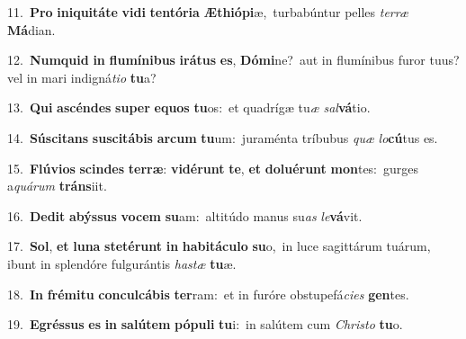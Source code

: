 {{\numbfont\textcolor{\numbcolor}{11.}}~\textbf{Pro} \textbf{in}\-\textbf{i}\textbf{qui}\textbf{tá}\textbf{te} \textbf{vi}\-\textbf{di} \textbf{ten}\-\textbf{tó}\textbf{ri}\textbf{a} \textbf{Æ}\-\textbf{thi}\textbf{ó}\textbf{pi}æ,~\star turbabúntur pelles \textit{ter}\-\textit{ræ} \textbf{Má}\-dian.\par
{\numbfont\textcolor{\numbcolor}{12.}}~\-\textbf{Num}\-\textbf{quid} \textbf{in} \textbf{flu}\-\textbf{mí}\textbf{ni}\textbf{bus} \textbf{i}\-\textbf{rá}\textbf{tus} \textbf{es}\-, \textbf{Dó}\-\textbf{mi}ne?~\star aut in flumínibus furor tuus? vel in mari indigná\-\textit{ti}\-\textit{o} \textbf{tu}\-a?\par
{\numbfont\textcolor{\numbcolor}{13.}}~\textbf{Qui} \textbf{a}\-\textbf{scén}\textbf{des} \textbf{su}\-\textbf{per} \textbf{e}\-\textbf{quos} \textbf{tu}\-os:~\star et quadrígæ tu\textit{æ} \textit{sal}\-\textbf{vá}tio.\par
{\numbfont\textcolor{\numbcolor}{14.}}~\-\textbf{Sú}\-\textbf{sci}\textbf{tans} \textbf{su}\-\textbf{sci}\textbf{tá}\textbf{bis} \textbf{ar}\-\textbf{cum} \textbf{tu}\-um:~\star juraménta tríbubus \textit{quæ} \textit{lo}\-\textbf{cú}tus es.\par
{\numbfont\textcolor{\numbcolor}{15.}}~\-\textbf{Flú}\-\textbf{vi}\textbf{os} \textbf{scin}\-\textbf{des} \textbf{ter}\-\textbf{ræ}: \textbf{vi}\-\textbf{dé}\textbf{runt} \textbf{te}\-, \textbf{et} \textbf{do}\-\textbf{lu}\textbf{é}\textbf{runt} \textbf{mon}\-tes:~\star gurges a\-\textit{quá}\-\textit{rum} \textbf{tráns}\-iit.\par
{\numbfont\textcolor{\numbcolor}{16.}}~\-\textbf{De}\-\textbf{dit} \textbf{a}\-\textbf{býs}\textbf{sus} \textbf{vo}\-\textbf{cem} \textbf{su}\-am:~\star altitúdo manus su\textit{as} \textit{le}\-\textbf{vá}vit.\par
{\numbfont\textcolor{\numbcolor}{17.}}~\-\textbf{Sol}\-, \textbf{et} \textbf{lu}\-\textbf{na} \textbf{ste}\-\textbf{té}\textbf{runt} \textbf{in} \textbf{ha}\-\textbf{bi}\textbf{tá}\textbf{cu}\textbf{lo} \textbf{su}\-o,~\star in luce sagittárum tuárum, ibunt in splendóre fulgurántis \textit{has}\-\textit{tæ} \textbf{tu}\-æ.\par
{\numbfont\textcolor{\numbcolor}{18.}}~\textbf{In} \textbf{fré}\-\textbf{mi}\textbf{tu} \textbf{con}\-\textbf{cul}\textbf{cá}\textbf{bis} \textbf{ter}\-ram:~\star et in furóre obstupefá\-\textit{ci}\-\textit{es} \textbf{gen}\-tes.\par
{\numbfont\textcolor{\numbcolor}{19.}}~\-\textbf{E}\-\textbf{grés}\textbf{sus} \textbf{es} \textbf{in} \textbf{sa}\-\textbf{lú}\textbf{tem} \textbf{pó}\-\textbf{pu}\textbf{li} \textbf{tu}\-i:~\star in salútem cum \textit{Chris}\-\textit{to} \textbf{tu}\-o.\par
}
